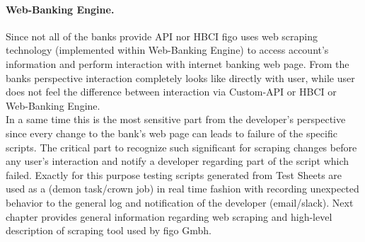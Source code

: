 	\paragraph{Web-Banking Engine.} Since not all of the banks provide API nor HBCI figo uses web scraping technology (implemented within Web-Banking Engine) to access account's information and perform interaction with internet banking web page.
	From the banks perspective interaction completely looks like directly with user, while user does not feel the difference between interaction via Custom-API or HBCI or Web-Banking Engine.\\
	In a same time this is the most sensitive part from the developer's perspective since every change to the bank's web page can leads to failure of the specific scripts. The critical part to recognize such significant for scraping changes before any user's interaction and notify a developer regarding part of the script which failed. Exactly for this purpose testing scripts generated from Test Sheets are used as a (demon task/crown job) in real time fashion with recording unexpected behavior to the general log and notification of the developer (email/slack). Next chapter provides general information regarding web scraping and high-level description of scraping tool used by figo Gmbh.
	

	
	
	

